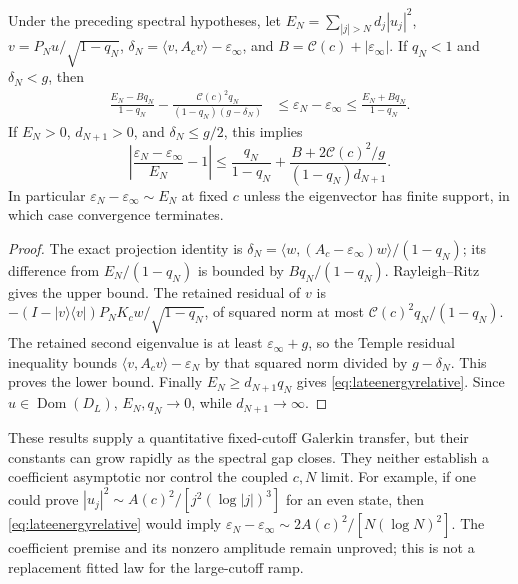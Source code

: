 \begin{proposition}
\label{prop:lateenergy}
Under the preceding spectral hypotheses, let
$E_N=\sum_{|j|>N}d_j|u_j|^2$, $v=P_Nu/\sqrt{1-q_N}$,
$\delta_N=\langle v,A_cv\rangle-\varepsilon_\infty$, and
$B=\mathcal C(c)+|\varepsilon_\infty|$.
If $q_N<1$ and $\delta_N<g$, then
\begin{align}
 \frac{E_N-Bq_N}{1-q_N}
 -\frac{\mathcal C(c)^2q_N}{(1-q_N)(g-\delta_N)}
 &\le\varepsilon_N-\varepsilon_\infty
 \le\frac{E_N+Bq_N}{1-q_N}.\label{eq:lateenergybounds}
\end{align}
If $E_N>0$, $d_{N+1}>0$, and $\delta_N\le g/2$, this implies
\begin{equation}
 \left|\frac{\varepsilon_N-\varepsilon_\infty}{E_N}-1\right|
 \le\frac{q_N}{1-q_N}
 +\frac{B+2\mathcal C(c)^2/g}{(1-q_N)d_{N+1}}.
 \label{eq:lateenergyrelative}
\end{equation}
In particular $\varepsilon_N-\varepsilon_\infty\sim E_N$ at fixed $c$
unless the eigenvector has finite support, in which case convergence terminates.
\end{proposition}
\begin{proof}
The exact projection identity is
$\delta_N=\langle w,(A_c-\varepsilon_\infty)w\rangle/(1-q_N)$;
its difference from $E_N/(1-q_N)$ is bounded by $Bq_N/(1-q_N)$.
Rayleigh--Ritz gives the upper bound. The retained residual of $v$ is
$-(I-|v\rangle\langle v|)P_NK_cw/\sqrt{1-q_N}$, of squared norm at most
$\mathcal C(c)^2q_N/(1-q_N)$. The retained second eigenvalue is at least
$\varepsilon_\infty+g$, so the Temple residual inequality bounds
$\langle v,A_cv\rangle-\varepsilon_N$ by that squared norm divided by
$g-\delta_N$. This proves the lower bound. Finally $E_N\ge d_{N+1}q_N$
gives \eqref{eq:lateenergyrelative}. Since $u\in\operatorname{Dom}(D_L)$,
$E_N,q_N\to0$, while $d_{N+1}\to\infty$.
\end{proof}

These results supply a quantitative fixed-cutoff Galerkin transfer, but their
constants can grow rapidly as the spectral gap closes. They neither establish
a coefficient asymptotic nor control the coupled $c,N$ limit. For example,
if one could prove $|u_j|^2\sim A(c)^2/[j^2(\log|j|)^3]$ for an even state,
then \eqref{eq:lateenergyrelative} would imply
$\varepsilon_N-\varepsilon_\infty\sim2A(c)^2/[N(\log N)^2]$.
The coefficient premise and its nonzero amplitude remain unproved; this is
not a replacement fitted law for the large-cutoff ramp.

